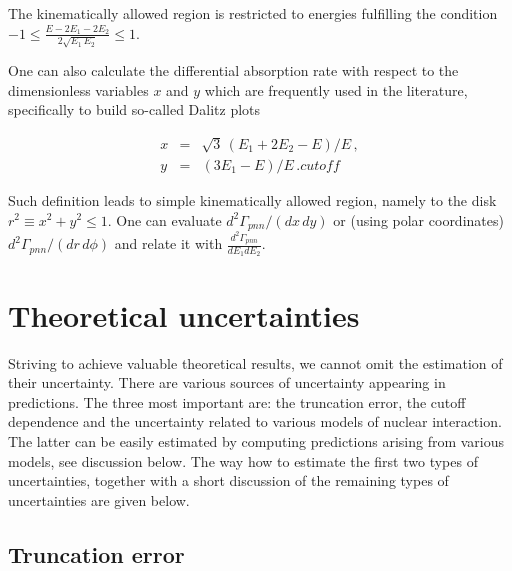    The kinematically allowed region is restricted to energies fulfilling 
    the condition 
    $ -1 \le \frac{E - 2 E_1 - 2 E_2 }{ 2 \sqrt{ E_1 \, E_2} } \le 1 $.

    One can also calculate the differential absorption rate with 
    respect to the dimensionless variables $x$ and $y$
    which are frequently used in the literature, specifically to build
    so-called Dalitz plots \cite{Gotta1995}

    \begin{eqnarray}
        x & = & \sqrt{3} \, ( E_1 + 2 E_2 - E ) / E \, , \nonumber \\
        y & = &  ( 3 E_1 - E ) / E \, .
    \label{xy}cutoff
    \end{eqnarray}

    Such definition leads to simple kinematically allowed region, namely to
    the disk $ r^2 \equiv x^2 + y^2 \le 1 $.
    One can evaluate 
    $ {d^2\Gamma_{pnn} }/ \left( {d x \, d y} \right) $
    or (using polar coordinates)
    $ {d^2\Gamma_{pnn} }/ \left( {d r \, d \phi} \right)$
    and relate it with $\frac{d^2\Gamma_{pnn}}{dE_1dE_2}$.

\section{Theoretical uncertainties}

    Striving to achieve valuable theoretical results, we cannot omit the estimation of their
    uncertainty. There are various sources of uncertainty appearing in predictions.
    The three most important are: the truncation error, the cutoff dependence and
    the uncertainty related to various models of nuclear interaction.
    The latter can be easily estimated by computing predictions arising from various 
    models, see discussion below.
    The way how to estimate the first two types of uncertainties, together with a short
    discussion of the remaining types of uncertainties are given below. 

    \subsection*{Truncation error}
    \label{sec:trunc}

